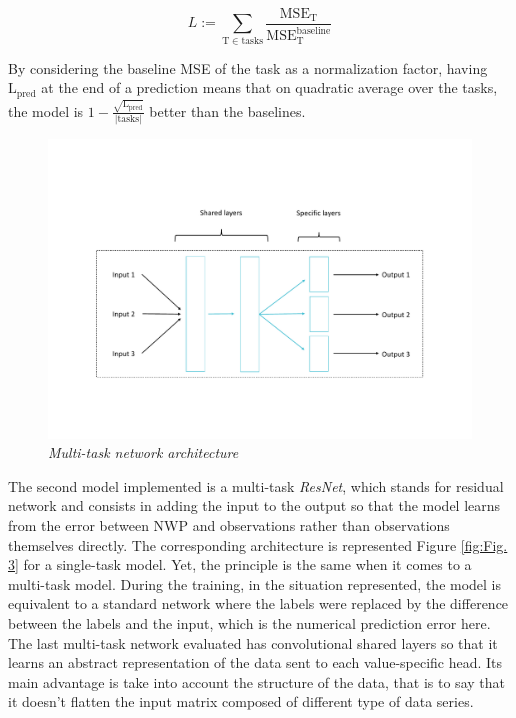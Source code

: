 \documentclass{article}
\begin{document}
\[
	L := \sum_{\mathrm T \in \mathrm{tasks}}
	\frac{\mathrm{MSE}_{\mathrm T}}{\mathrm{MSE}^{\mathrm{baseline}}_{\mathrm T}}
\]

\vspace{5px}

By considering the baseline MSE of the task as a normalization factor, having $\mathrm L_{\mathrm{pred}}$ at
the end of a prediction means that on quadratic average over the tasks, the model is
$1 - \frac{\sqrt{\mathrm L_{\mathrm{pred}}}}{| \mathrm{tasks} | }$ better than the baselines.

\vspace{-40px}

\begin{figure}[H]
    \centering
    \includegraphics[width=.9\linewidth]{img/heads.pdf}
    \vspace{-30px}
    \caption{\textit{Multi-task network architecture}}
    \label{fig:Fig. 2}
\end{figure}

The second model implemented is a multi-task \emph{ResNet}, which stands for residual network and consists in adding
the input to the output so that the model learns from the error between NWP and observations rather than observations
themselves directly. The corresponding architecture is represented Figure \ref{fig:Fig. 3} for a single-task model. Yet,
the principle is the same when it comes to a multi-task model. During the training, in the situation represented,
the model is equivalent to a standard network where the labels were replaced by the difference between the
labels and the input, which is the numerical prediction error here.
The last multi-task network evaluated has convolutional shared layers so that it learns an abstract representation of the
data sent to each value-specific head. Its main advantage is take into account the structure of the data, that is to say
that it doesn't flatten the input matrix composed of different type of data series.
\end{document}

